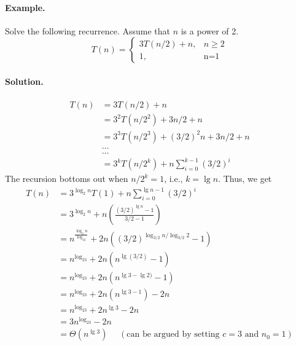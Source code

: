 \documentclass[11pt,twoside]{article}
\begin{document}
\paragraph{Example.} Solve the following recurrence. Assume that $n$
is a power of 2.
\[
T(n) = \left\{ \begin{array}{ll}
      3T(n/2) + n, &  n \geq 2 \\
      1, & \mbox{n=1}
      \end{array} \right.
\]
\paragraph{Solution.}
\begin{align*}
T(n) & =  3T(n/2) + n \\
& =  3^2T(n/2^2) + 3n/2 + n \\
& = 3^3T(n/2^3) + (3/2)^2n + 3n/2 + n \\
&  \ldots \\
&  \ldots \\
& = 3^kT(n/2^k) + n\sum_{i=0}^{k-1}(3/2)^i
\end{align*}
\noindent
The recursion bottoms out when $n/2^k = 1$, i.e., $k=\lg n$. Thus, we get
\begin{align*}
T(n) & =  3^{\log_2n}T(1) + n\sum_{i=0}^{\lg n-1}(3/2)^i \\
     & = 3^{\log_2n} + n\left (\frac{(3/2)^{\lg n}-1}{3/2 -1}\right ) \\
     & = n^{\frac{\log_3n}{\log_32}} + 2n((3/2)^{\log_{3/2}n/\log_{3/2}2}-1)\\
     & = n^{\log_23} + 2n(n^{\lg (3/2)}-1) \\
     & = n^{\log_23} + 2n(n^{\lg 3- \lg 2)}-1) \\
     & = n^{\log_23} + 2n(n^{\lg 3-1}) - 2n \\
     & = n^{\log_23} + 2n^{\lg 3} -2n\\
     & = 3n^{\log_23} -2n\\
     & = \Theta(n^{\lg 3}) ~~~~~~ (\mbox{can be argued by setting $c=3$ and $n_0=1$})
\end{align*}
\end{document}
